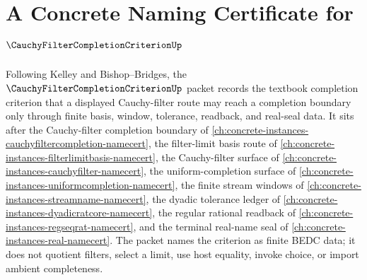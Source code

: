 \chapter{A Concrete Naming Certificate for $\CauchyFilterCompletionCriterionUp$}
\label{ch:concrete-instances-cauchy-filter-completion-criterion-namecert}

Following Kelley and Bishop--Bridges, the $\CauchyFilterCompletionCriterionUp$ packet records the textbook completion criterion that a displayed Cauchy-filter route may reach a completion boundary only through finite basis, window, tolerance, readback, and real-seal data. It sits after the Cauchy-filter completion boundary of \autoref{ch:concrete-instances-cauchyfiltercompletion-namecert}, the filter-limit basis route of \autoref{ch:concrete-instances-filterlimitbasis-namecert}, the Cauchy-filter surface of \autoref{ch:concrete-instances-cauchyfilter-namecert}, the uniform-completion surface of \autoref{ch:concrete-instances-uniformcompletion-namecert}, the finite stream windows of \autoref{ch:concrete-instances-streamname-namecert}, the dyadic tolerance ledger of \autoref{ch:concrete-instances-dyadicratcore-namecert}, the regular rational readback of \autoref{ch:concrete-instances-regseqrat-namecert}, and the terminal real-name seal of \autoref{ch:concrete-instances-real-namecert}. The packet names the criterion as finite BEDC data; it does not quotient filters, select a limit, use host equality, invoke choice, or import ambient completeness.

